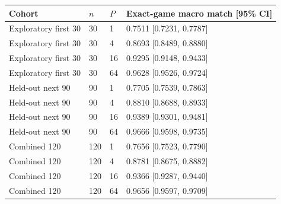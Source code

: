\begingroup\footnotesize
\begin{tabular}{llll}
\toprule
Cohort & $n$ & $P$ & Exact-game macro match [95\% CI] \\
\midrule
Exploratory first 30 & 30 & 1 & 0.7511 [0.7231, 0.7787] \\
Exploratory first 30 & 30 & 4 & 0.8693 [0.8489, 0.8880] \\
Exploratory first 30 & 30 & 16 & 0.9295 [0.9148, 0.9433] \\
Exploratory first 30 & 30 & 64 & 0.9628 [0.9526, 0.9724] \\
Held-out next 90 & 90 & 1 & 0.7705 [0.7539, 0.7863] \\
Held-out next 90 & 90 & 4 & 0.8810 [0.8688, 0.8933] \\
Held-out next 90 & 90 & 16 & 0.9389 [0.9301, 0.9481] \\
Held-out next 90 & 90 & 64 & 0.9666 [0.9598, 0.9735] \\
Combined 120 & 120 & 1 & 0.7656 [0.7523, 0.7790] \\
Combined 120 & 120 & 4 & 0.8781 [0.8675, 0.8882] \\
Combined 120 & 120 & 16 & 0.9366 [0.9287, 0.9440] \\
Combined 120 & 120 & 64 & 0.9656 [0.9597, 0.9709] \\
\bottomrule
\end{tabular}
\endgroup
